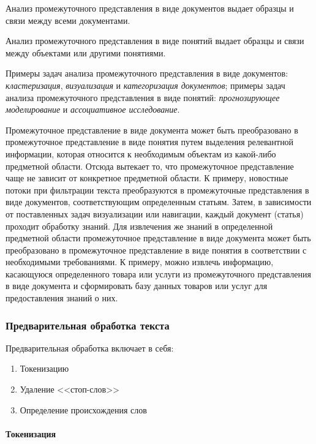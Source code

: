\documentclass[14pt]{matmex-diploma-custom}
\begin{document}
Анализ промежуточного представления в виде документов выдает образцы и связи между всеми документами. 

Анализ промежуточного представления в виде понятий выдает образцы и связи между объектами или другими понятиями.

Примеры задач анализа промежуточного представления в виде документов: \emph{кластеризация}, \emph{визуализация} и \emph{категоризация документов}; примеры задач анализа промежуточного представления в виде понятий: \emph{прогнозирующее моделирование} и \emph{ассоциативное исследование}.

Промежуточное представление в виде документа может быть преобразовано в промежуточное представление в виде понятия путем выделения релевантной информации, которая относится к необходимым объектам из какой-либо предметной области. Отсюда вытекает то, что промежуточное представление чаще не зависит от конкретное предметной области. К примеру, новостные потоки при фильтрации текста преобразуются в промежуточные представления в виде документов, соответствующим определенным статьям. Затем, в зависимости от поставленных задач визуализации или навигации, каждый документ (статья) проходит обработку знаний. Для извлечения же знаний в определенной предметной области промежуточное представление в виде документа может быть преобразовано в промежуточное представление в виде понятия в соответствии с необходимыми требованиями. К примеру, можно извлечь информацию, касающуюся определенного товара или услуги из промежуточного представления в виде документа и сформировать базу данных товаров или услуг для предоставления знаний о них.

\subsubsection{Предварительная обработка текста}

Предварительная обработка включает в себя:

\begin{enumerate}
\item Токенизацию
\item Удаление <<стоп-слов>>
\item Определение происхождения слов
\end{enumerate}

\paragraph{Токенизация} 
\end{document}
